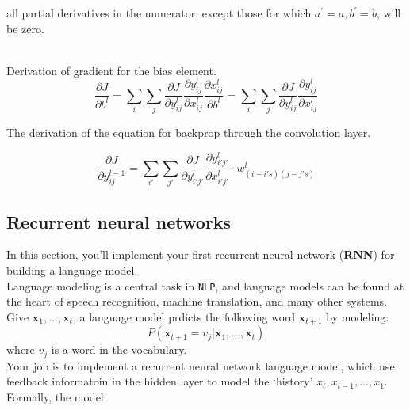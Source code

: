 all partial derivatives in the numerator, except those for which $a^{'}= a, b^{'} = b$, will be zero. 

~\\
Derivation of gradient for the bias element. 
\begin{equation}
 \dfrac{\partial J}{\partial b^l} = \sum_{i}\sum_{j} \dfrac{\partial J}{\partial y^l_{ij}}\dfrac{\partial y^l_{ij}}{\partial x^l_{ij}}\dfrac{\partial x^l_{ij}}{\partial b^l} = \sum_{i}\sum_{j} \dfrac{\partial J}{\partial y^l_{ij}}\dfrac{\partial y^l_{ij}}{\partial x^l_{ij}} 
\end{equation}

\noindent The derivation of the equation for backprop through the convolution layer.

\begin{equation}
\frac{\partial J}{\partial y^{l-1}_{ij}}= \sum_{i'}\sum_{j'} \frac{\partial J}{\partial y^l_{i'j'}}\frac{\partial y^l_{i'j'}}{\partial x^l_{i'j'}} \cdot w^{l}_{(i-i's)(j-j's)}
\end{equation}

\subsection{Recurrent neural networks} 

\noindent In this section, you'll implement your first recurrent neural network (\textbf{RNN}) for building a language model.\\

\noindent Language modeling is a central task in \texttt{NLP}, and language models can be found at the heart of speech recognition, machine translation, and many other systems. Give ${\boldsymbol x}_{1}, ..., {\boldsymbol x}_{t}$, a language model prdicts the following word ${\boldsymbol x}_{t+1}$ by modeling:\\
\begin{equation}
P({\boldsymbol x}_{t+1} = v_{j} | {\boldsymbol x}_{1}, ..., {\boldsymbol x}_{t})
\end{equation}
where $v_{j}$ is a word in the vocabulary.\\

\noindent Your job is to implement a recurrent neural network language model, which use feedback informatoin in the hidden layer to model the `history' $x_{t}, x_{t-1}, ..., x_{1}$. Formally, the model

